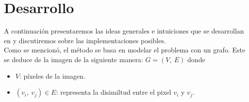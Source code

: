 \section{Desarrollo}

A continuaci\'on presentaremos las ideas generales e intuiciones que se desarrollan en \cite{Felzenszwalb2004} y discutiremos sobre las implementaciones posibles.\\
\indent Como se mencion\'o, el m\'etodo se basa en modelar el problema con un grafo. Este se deduce de la imagen de la siguiente manera: $G=(V,\ E)$ donde 
\begin{itemize}
	\item[] $V$: píxeles de la imagen.
	\item[] $(v_i,\ v_j)\in E$: representa la disimiltud entre el pixel $v_i$ y $v_j$.
\end{itemize}
 

